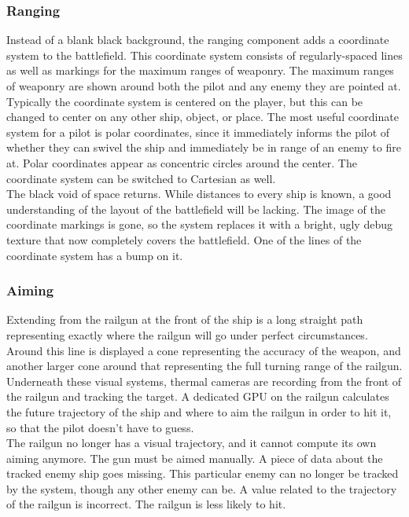 \documentclass[a4paper]{article}
\begin{document}
\vspace{-0.5cm} \hspace{-18pt} \subsubsection{Ranging} \label{fighter_ranging} \vspace{-0.2cm}
Instead of a blank black background, the ranging component adds a coordinate system to the battlefield. This coordinate system consists of regularly-spaced lines as well as markings for the maximum ranges of weaponry. The maximum ranges of weaponry are shown around both the pilot and any enemy they are pointed at. Typically the coordinate system is centered on the player, but this can be changed to center on any other ship, object, or place. The most useful coordinate system for a pilot is polar coordinates, since it immediately informs the pilot of whether they can swivel the ship and immediately be in range of an enemy to fire at. Polar coordinates appear as concentric circles around the center. The coordinate system can be switched to Cartesian as well.
\\ \cci
{The black void of space returns. While distances to every ship is known, a good understanding of the layout of the battlefield will be lacking.}
{The image of the coordinate markings is gone, so the system replaces it with a bright, ugly debug texture that now completely covers the battlefield.}
{One of the lines of the coordinate system has a bump on it.}

\vspace{-0.5cm} \hspace{-18pt} \subsubsection{Aiming} \label{fighter_aiming} \vspace{-0.2cm}
Extending from the railgun at the front of the ship is a long straight path representing exactly where the railgun will go under perfect circumstances. Around this line is displayed a cone representing the accuracy of the weapon, and another larger cone around that representing the full turning range of the railgun. Underneath these visual systems, thermal cameras are recording from the front of the railgun and tracking the target. A dedicated GPU on the railgun calculates the future trajectory of the ship and where to aim the railgun in order to hit it, so that the pilot doesn't have to guess.
\\ \cci
{The railgun no longer has a visual trajectory, and it cannot compute its own aiming anymore. The gun must be aimed manually.}
{A piece of data about the tracked enemy ship goes missing. This particular enemy can no longer be tracked by the system, though any other enemy can be.}
{A value related to the trajectory of the railgun is incorrect. The railgun is less likely to hit.}
\end{document}
